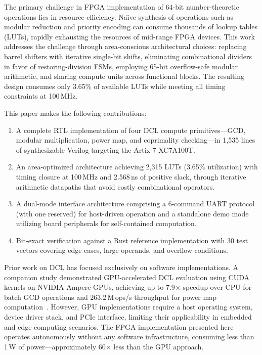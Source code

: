 \documentclass[lettersize,journal]{IEEEtran}
\begin{document}
The primary challenge in FPGA implementation of 64-bit number-theoretic operations lies in resource efficiency. Na\"{\i}ve synthesis of operations such as modular reduction and priority encoding can consume thousands of lookup tables (LUTs), rapidly exhausting the resources of mid-range FPGA devices. This work addresses the challenge through area-conscious architectural choices: replacing barrel shifters with iterative single-bit shifts, eliminating combinational dividers in favor of restoring-division FSMs, employing 65-bit overflow-safe modular arithmetic, and sharing compute units across functional blocks. The resulting design consumes only 3.65\% of available LUTs while meeting all timing constraints at 100\,MHz.

This paper makes the following contributions:
\begin{enumerate}
\item A complete RTL implementation of four DCL compute primitives---GCD, modular multiplication, power map, and coprimality checking---in 1{,}535 lines of synthesizable Verilog targeting the Artix-7 XC7A100T.
\item An area-optimized architecture achieving 2{,}315 LUTs (3.65\% utilization) with timing closure at 100\,MHz and 2.568\,ns of positive slack, through iterative arithmetic datapaths that avoid costly combinational operators.
\item A dual-mode interface architecture comprising a 6-command UART protocol (with one reserved) for host-driven operation and a standalone demo mode utilizing board peripherals for self-contained computation.
\item Bit-exact verification against a Rust reference implementation with 30 test vectors covering edge cases, large operands, and overflow conditions.
\end{enumerate}

Prior work on DCL has focused exclusively on software implementations. A companion study demonstrated GPU-accelerated DCL evaluation using CUDA kernels on NVIDIA Ampere GPUs, achieving up to 7.9$\times$ speedup over CPU for batch GCD operations and 263.2\,M\,ops/s throughput for power map computation~\cite{bernstein2014}. However, GPU implementations require a host operating system, device driver stack, and PCIe interface, limiting their applicability in embedded and edge computing scenarios. The FPGA implementation presented here operates autonomously without any software infrastructure, consuming less than 1\,W of power---approximately 60$\times$ less than the GPU approach.
\end{document}
